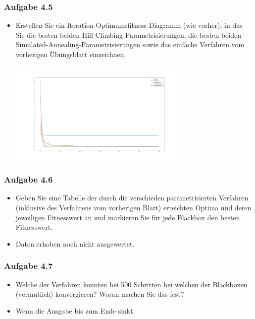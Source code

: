 \documentclass[xcolor=pdftex,dvipsnames,table]{beamer}
\begin{document}
\begin{frame}
  \frametitle{Aufgabe 4.5}
  \begin{itemize}
  		\item Erstellen Sie ein Iteration-Optimumsfitness-Diagramm (wie vorher), in das Sie die besten beiden
Hill-Climbing-Parametrisierungen, die besten beiden Simulated-Annealing-Parametrisierungen sowie
das einfache Verfahren vom vorherigen Übungsblatt einzeichnen.
  \end{itemize}
\includegraphics[width=100mm, height=50mm]{img/a5.png} 
\end{frame}

\begin{frame}
  \frametitle{Aufgabe 4.6}
  \begin{itemize}
  		\item Geben Sie eine Tabelle der durch die verschieden parametrisierten Verfahren (inklusive des
Verfahrens vom vorherigen Blatt) erreichten Optima und deren jeweiligen Fitnesswert an und
markieren Sie für jede Blackbox den besten Fitnesswert.

\item Daten erhoben noch nicht ausgewertet.

  \end{itemize}
    
\end{frame}

\begin{frame}
  \frametitle{Aufgabe 4.7}
  \begin{itemize}
  		\item Welche der Verfahren konnten bei 500 Schritten bei welchen der Blackboxen (vermutlich) konvergieren?
Woran machen Sie das fest?

\item Wenn die Ausgabe bis zum Ende sinkt.
  \end{itemize}
\end{frame}
\end{document}
